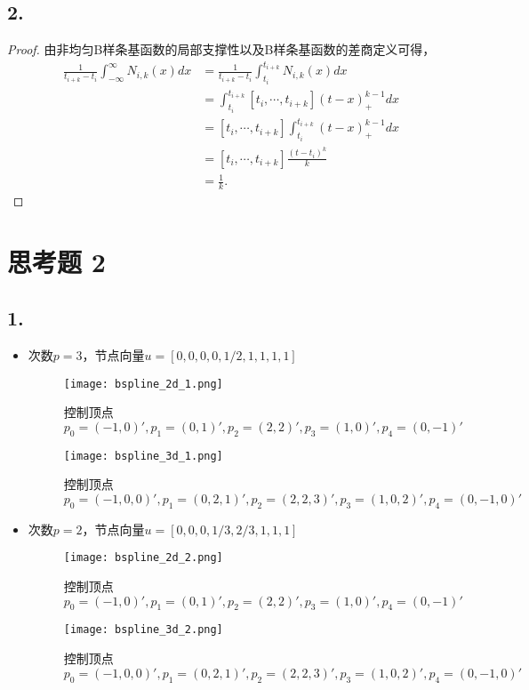 \documentclass[utf8]{ctexart}
\begin{document}
\subsection*{2.}
\begin{proof}
    由非均匀B样条基函数的局部支撑性以及B样条基函数的差商定义可得，
    \begin{equation}
        \begin{aligned}
            \frac{1}{t_{i+k}-t_i}\int_{-\infty}^{\infty}N_{i,k}(x)dx &=  \frac{1}{t_{i+k}-t_i}\int_{t_{i}}^{t_{i+k}}N_{i,k}(x)dx\\
            &= \int_{t_{i}}^{t_{i+k}}[t_i,\cdots,t_{i+k}](t-x)_+^{k-1}dx\\
            &= [t_i,\cdots,t_{i+k}]\int_{t_{i}}^{t_{i+k}}(t-x)_+^{k-1}dx\\
            &= [t_i,\cdots,t_{i+k}]\frac{(t-t_i)^k}{k}\\
            &= \frac{1}{k}.
        \end{aligned}
    \end{equation}
\end{proof}

\section*{思考题 2}
\subsection*{1.}
\begin{itemize}
    \item 次数$p=3$，节点向量$u = [0, 0, 0, 0, 1/2, 1, 1, 1, 1]$
    \begin{figure}[H]
        \centering
        \texttt{[image: bspline\_2d\_1.png]}
        \label{fig: bspline_2d_1}
        \caption{控制顶点
        $p_0=(-1,0)', p_1=(0,1)', p_2=(2,2)', p_3=(1,0)', p_4=(0,-1)'$}
    \end{figure}
    \begin{figure}[H]
        \centering
        \texttt{[image: bspline\_3d\_1.png]}
        \label{fig: bspline_3d_1}
        \caption{控制顶点
        $p_0=(-1,0,0)', p_1=(0,2,1)', p_2=(2,2,3)', p_3=(1,0,2)', p_4=(0,-1,0)'$}
    \end{figure}
    \item 次数$p=2$，节点向量$u = [0, 0, 0, 1/3, 2/3, 1, 1, 1]$
    \begin{figure}[H]
        \centering
        \texttt{[image: bspline\_2d\_2.png]}
        \label{fig: bspline_2d_2}
        \caption{控制顶点
        $p_0=(-1,0)', p_1=(0,1)', p_2=(2,2)', p_3=(1,0)', p_4=(0,-1)'$}
    \end{figure}
    \begin{figure}[H]
        \centering
        \texttt{[image: bspline\_3d\_2.png]}
        \label{fig: bspline_3d_2}
        \caption{控制顶点
        $p_0=(-1,0,0)', p_1=(0,2,1)', p_2=(2,2,3)', p_3=(1,0,2)', p_4=(0,-1,0)'$}
    \end{figure}
\end{itemize}
\end{document}
